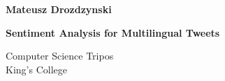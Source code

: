 \pagestyle{empty}

\hfill{\bf Mateusz Drozdzynski}

\vspace*{60mm}

\begin{center}
  \Huge
  {\bf Sentiment Analysis for Multilingual Tweets} \\

  \vspace*{5mm}
  
  \Large
  Computer Science Tripos \\
  
  \vspace*{5mm}
  King's College \\
  
  \vspace*{5mm}
  
  \the\year
\end{center}

\cleardoublepage
